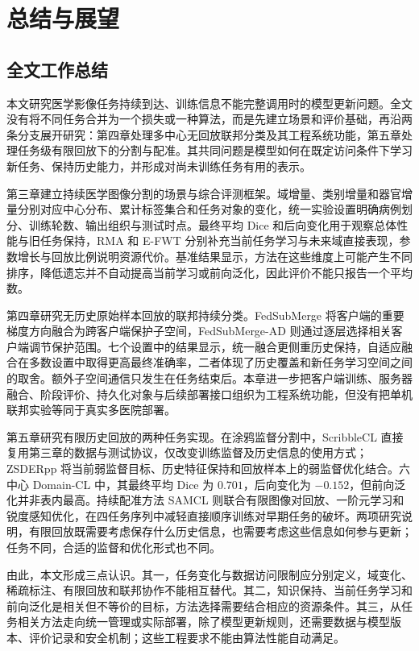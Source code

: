 \chapter{总结与展望}
\label{chap:conclusion}

\section{全文工作总结}
\label{sec:conclusion-summary}

本文研究医学影像任务持续到达、训练信息不能完整调用时的模型更新问题。全文没有将不同任务合并为一个损失或一种算法，而是先建立场景和评价基础，再沿两条分支展开研究：第四章处理多中心无回放联邦分类及其工程系统功能，第五章处理任务级有限回放下的分割与配准。其共同问题是模型如何在既定访问条件下学习新任务、保持历史能力，并形成对尚未训练任务有用的表示。

第三章建立持续医学图像分割的场景与综合评测框架。域增量、类别增量和器官增量分别对应中心分布、累计标签集合和任务对象的变化，统一实验设置明确病例划分、训练轮数、输出组织与测试时点。最终平均 Dice 和后向变化用于观察总体性能与旧任务保持，RMA 和 E-FWT 分别补充当前任务学习与未来域直接表现，参数增长与回放比例说明资源代价。基准结果显示，方法在这些维度上可能产生不同排序，降低遗忘并不自动提高当前学习或前向泛化，因此评价不能只报告一个平均数。

第四章研究无历史原始样本回放的联邦持续分类。FedSubMerge 将客户端的重要梯度方向融合为跨客户端保护子空间，FedSubMerge-AD 则通过逐层选择相关客户端调节保护范围。七个设置中的结果显示，统一融合更侧重历史保持，自适应融合在多数设置中取得更高最终准确率，二者体现了历史覆盖和新任务学习空间之间的取舍。额外子空间通信只发生在任务结束后。本章进一步把客户端训练、服务器融合、阶段评价、持久化对象与后续部署接口组织为工程系统功能，但没有把单机联邦实验等同于真实多医院部署。

第五章研究有限历史回放的两种任务实现。在涂鸦监督分割中，ScribbleCL 直接复用第三章的数据与测试协议，仅改变训练监督及历史信息的使用方式；ZSDERpp 将当前弱监督目标、历史特征保持和回放样本上的弱监督优化结合。六中心 Domain-CL 中，其最终平均 Dice 为 $0.701$，后向变化为 $-0.152$，但前向泛化并非表内最高。持续配准方法 SAMCL 则联合有限图像对回放、一阶元学习和锐度感知优化，在四任务序列中减轻直接顺序训练对早期任务的破坏。两项研究说明，有限回放既需要考虑保存什么历史信息，也需要考虑这些信息如何参与更新；任务不同，合适的监督和优化形式也不同。

由此，本文形成三点认识。其一，任务变化与数据访问限制应分别定义，域变化、稀疏标注、有限回放和联邦协作不能相互替代。其二，知识保持、当前任务学习和前向泛化是相关但不等价的目标，方法选择需要结合相应的资源条件。其三，从任务相关方法走向统一管理或实际部署，除了模型更新规则，还需要数据与模型版本、评价记录和安全机制；这些工程要求不能由算法性能自动满足。

